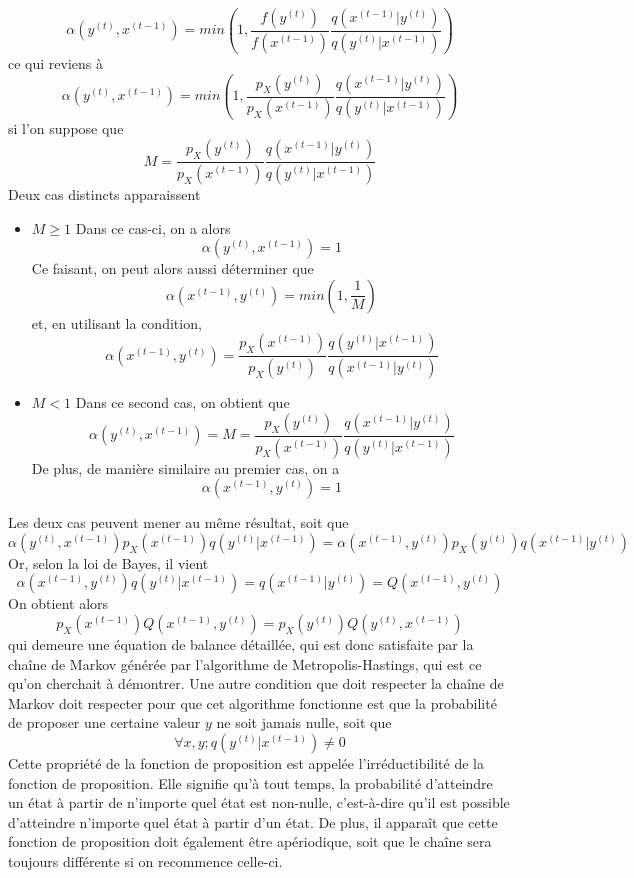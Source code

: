 \documentclass[a4paper, 11pt]{article}
\begin{document}
\begin{equation}
    \alpha (y^{(t)},x^{(t-1)})=min \left( 1 , \frac{f (y^{(t)})}{f (x^{(t-1)})} \frac{q(x^{(t-1)}|y^{(t)})}{q(y^{(t)}|x^{(t-1)})} \right)
\end{equation}
ce qui reviens à 
\begin{equation}
    \alpha (y^{(t)},x^{(t-1)})=min \left( 1 , \frac{p_X (y^{(t)})}{p_X (x^{(t-1)})} \frac{q(x^{(t-1)}|y^{(t)})}{q(y^{(t)}|x^{(t-1)})} \right)
\end{equation}
si l'on suppose que
$$M=\frac{p_X (y^{(t)})}{p_X (x^{(t-1)})} \frac{q(x^{(t-1)}|y^{(t)})}{q(y^{(t)}|x^{(t-1)})}$$
Deux cas distincts apparaissent
\begin{itemize}[label=\textbullet]
    \item \underline{$M\ge 1$}
    Dans ce cas-ci, on a alors 
    $$\alpha (y^{(t)},x^{(t-1)})=1$$
    Ce faisant, on peut alors aussi déterminer que
    $$\alpha (x^{(t-1)},y^{(t)})=min(1,\frac{1}{M})$$
    et, en utilisant la condition,
    $$\alpha (x^{(t-1)},y^{(t)})=\frac{p_X (x^{(t-1)})}{p_X (y^{(t)})} \frac{q(y^{(t)}|x^{(t-1)})}{q(x^{(t-1)}|y^{(t)})}$$ 
    \item \underline{$M< 1$}
    Dans ce second cas, on obtient que
    $$\alpha (y^{(t)},x^{(t-1)})=M=\frac{p_X (y^{(t)})}{p_X (x^{(t-1)})} \frac{q(x^{(t-1)}|y^{(t)})}{q(y^{(t)}|x^{(t-1)})}$$
    De plus, de manière similaire au premier cas, on a 
    $$\alpha (x^{(t-1)},y^{(t)})=1$$
    \end{itemize}
    Les deux cas peuvent mener au même résultat, soit que
    \begin{equation}
        \alpha (y^{(t)},x^{(t-1)}) p_X (x^{(t-1)}) q(y^{(t)}|x^{(t-1)})=\alpha (x^{(t-1)},y^{(t)}) p_X (y^{(t)}) q(x^{(t-1)}|y^{(t)})
    \end{equation}
    Or, selon la loi de Bayes, il vient
    $$ \alpha (x^{(t-1)},y^{(t)}) q(y^{(t)}|x^{(t-1)})=q(x^{(t-1)}|y^{(t)})=Q(x^{(t-1)},y^{(t)})$$
    On obtient alors
    \begin{equation}
    p_X (x^{(t-1)}) Q(x^{(t-1)},y^{(t)})=p_X (y^{(t)}) Q(y^{(t)},x^{(t-1)})
    \end{equation}
    qui demeure une équation de balance détaillée, qui est donc satisfaite par la chaîne de Markov générée par l'algorithme de Metropolis-Hastings, qui est ce qu'on cherchait à démontrer. Une autre condition que doit respecter la chaîne de Markov doit respecter pour que cet algorithme fonctionne est que la probabilité de proposer une certaine valeur $y$ ne soit jamais nulle, soit que 
    $$\forall x,y; q(y^{(t)}|x^{(t-1)})\ne 0$$
    Cette propriété de la fonction de proposition est appelée l'irréductibilité  de la fonction de proposition. Elle signifie qu'à tout temps, la probabilité d'atteindre un état à partir de n'importe quel état est non-nulle, c'est-à-dire qu'il est possible d'atteindre n'importe quel état à partir d'un état. De plus, il apparaît que cette fonction de proposition doit également être apériodique, soit que le chaîne sera toujours différente si on recommence celle-ci.
    \newpage
\end{document}
